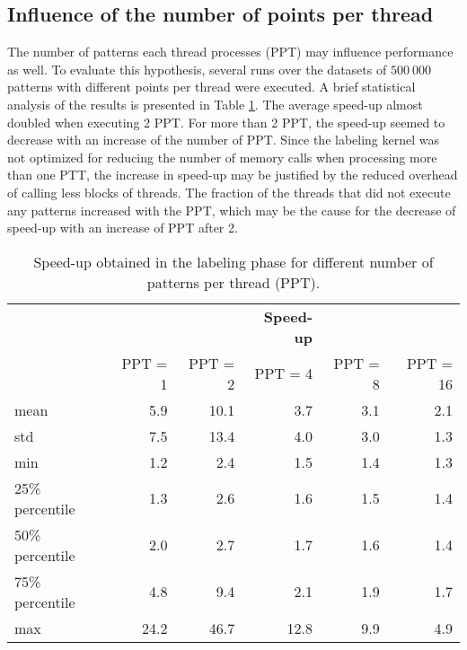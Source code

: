 \subsection{Influence of the number of points per thread}

The number of patterns each thread processes (PPT) may influence performance as well.
To evaluate this hypothesis, several runs over the datasets of $500 \: 000$ patterns with different points per thread were executed.
A brief statistical analysis of the results is presented in Table \ref{tab:kmeans cuda ppt}.
The average speed-up almost doubled when executing 2 PPT.
For more than 2 PPT, the speed-up seemed to decrease with an increase of the number of PPT.
Since the labeling kernel was not optimized for reducing the number of memory calls when processing more than one PTT, the increase in speed-up may be justified by the reduced overhead of calling less blocks of threads.
The fraction of the threads that did not execute any patterns increased with the PPT, which may be the cause for the decrease of speed-up with an increase of PPT after 2.

\begin{table}[h]
\centering
\caption{Speed-up obtained in the labeling phase for different number of patterns per thread (PPT).}


\begin{tabular}{lrrrrr}
\toprule
{} &       {} 	   &   {} 		   &  \textbf{Speed-up}  & {} 		& {}\\
{} &       PPT = 1 &       PPT = 2 &       PPT = 4 &       PPT = 8 &      PPT = 16 \\
\midrule
mean  			 &   5.9 &  10.1 &   3.7 &   3.1 &   2.1 \\
std   			 &   7.5 &  13.4 &   4.0 &   3.0 &   1.3 \\
min   			 &   1.2 &   2.4 &   1.5 &   1.4 &   1.3 \\
25\% percentile  &   1.3 &   2.6 &   1.6 &   1.5 &   1.4 \\
50\% percentile  &   2.0 &   2.7 &   1.7 &   1.6 &   1.4 \\
75\% percentile  &   4.8 &   9.4 &   2.1 &   1.9 &   1.7 \\
max   			 &  24.2 &  46.7 &  12.8 &   9.9 &   4.9 \\
\bottomrule
\end{tabular}

\label{tab:kmeans cuda ppt}
\end{table}